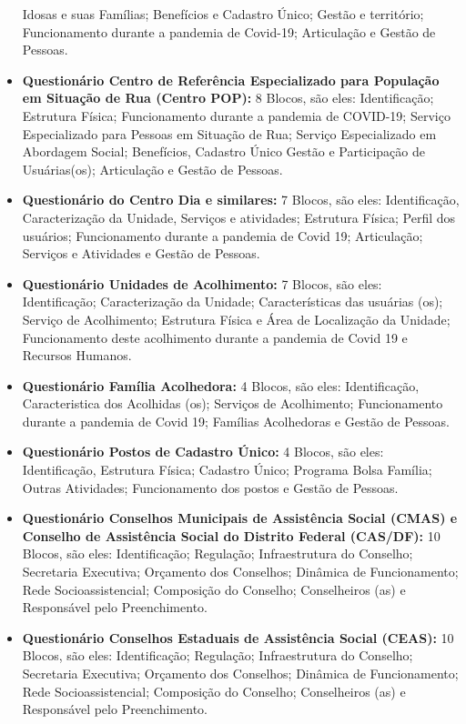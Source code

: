 \documentclass[
  brazilian]{report}
\begin{document}
\begin{itemize}
  Idosas e suas Famílias; Benefícios e Cadastro Único; Gestão e
  território; Funcionamento durante a pandemia de Covid-19; Articulação
  e Gestão de Pessoas.
\item
  \textbf{Questionário Centro de Referência Especializado para População
  em Situação de Rua (Centro POP):} 8 Blocos, são eles: Identificação;
  Estrutura Física; Funcionamento durante a pandemia de COVID-19;
  Serviço Especializado para Pessoas em Situação de Rua; Serviço
  Especializado em Abordagem Social; Benefícios, Cadastro Único Gestão e
  Participação de Usuárias(os); Articulação e Gestão de Pessoas.
\item
  \textbf{Questionário do Centro Dia e similares:} 7 Blocos, são eles:
  Identificação, Caracterização da Unidade, Serviços e atividades;
  Estrutura Física; Perfil dos usuários; Funcionamento durante a
  pandemia de Covid 19; Articulação; Serviços e Atividades e Gestão de
  Pessoas.
\item
  \textbf{Questionário Unidades de Acolhimento:} 7 Blocos, são eles:
  Identificação; Caracterização da Unidade; Características das usuárias
  (os); Serviço de Acolhimento; Estrutura Física e Área de Localização
  da Unidade; Funcionamento deste acolhimento durante a pandemia de
  Covid 19 e Recursos Humanos.
\item
  \textbf{Questionário Família Acolhedora:} 4 Blocos, são eles:
  Identificação, Caracteristica dos Acolhidas (os); Serviços de
  Acolhimento; Funcionamento durante a pandemia de Covid 19; Famílias
  Acolhedoras e Gestão de Pessoas.
\item
  \textbf{Questionário Postos de Cadastro Único:} 4 Blocos, são eles:
  Identificação, Estrutura Física; Cadastro Único; Programa Bolsa
  Família; Outras Atividades; Funcionamento dos postos e Gestão de
  Pessoas.
\item
  \textbf{Questionário Conselhos Municipais de Assistência Social (CMAS)
  e Conselho de Assistência Social do Distrito Federal (CAS/DF):} 10
  Blocos, são eles: Identificação; Regulação; Infraestrutura do
  Conselho; Secretaria Executiva; Orçamento dos Conselhos; Dinâmica de
  Funcionamento; Rede Socioassistencial; Composição do Conselho;
  Conselheiros (as) e Responsável pelo Preenchimento.
\item
  \textbf{Questionário Conselhos Estaduais de Assistência Social
  (CEAS):} 10 Blocos, são eles: Identificação; Regulação; Infraestrutura
  do Conselho; Secretaria Executiva; Orçamento dos Conselhos; Dinâmica
  de Funcionamento; Rede Socioassistencial; Composição do Conselho;
  Conselheiros (as) e Responsável pelo Preenchimento.
\end{itemize}
\end{document}
